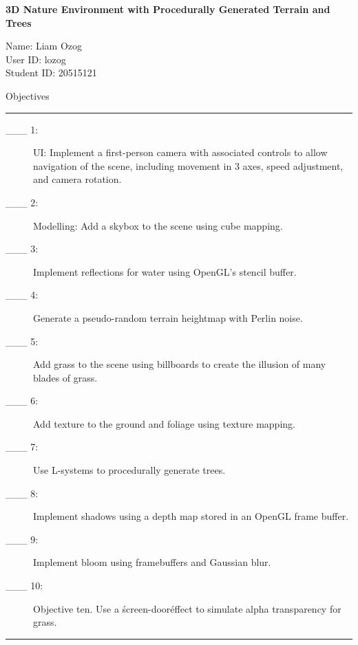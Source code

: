 \documentclass{article}
\newcommand\projecttitle{3D Nature Environment with Procedurally Generated Terrain and Trees}
\newcommand\myname{Liam Ozog}
\newcommand\myuserid{lozog}
\newcommand\mystudentid{20515121}
\begin{document}
\newpage

{\huge \bf 
	\projecttitle 
}

\medskip
Name: \myname \\ 
User ID: \myuserid \\ 
Student ID: \mystudentid 

\bigskip
{\Large Objectives}

\hrule
\begin{description}
        \item[\_\_\_ 1:]
          UI: Implement a first-person camera with associated controls to allow navigation of the scene, including movement in 3 axes, speed adjustment, and camera rotation.

        \item[\_\_\_ 2:]
		  Modelling: Add a skybox to the scene using cube mapping.

        \item[\_\_\_ 3:]
		  Implement reflections for water using OpenGL's stencil buffer.
			
        \item[\_\_\_ 4:]
		  Generate a pseudo-random terrain heightmap with Perlin noise.

        \item[\_\_\_ 5:]
		  Add grass to the scene using billboards to create the illusion of many blades of grass.

        \item[\_\_\_ 6:]
	      Add texture to the ground and foliage using texture mapping.

        \item[\_\_\_ 7:]
		  Use L-systems to procedurally generate trees.

        \item[\_\_\_ 8:]
		  Implement shadows using a depth map stored in an OpenGL frame buffer.

        \item[\_\_\_ 9:]
		  Implement bloom using framebuffers and Gaussian blur.

        \item[\_\_\_ 10:]
		  Objective ten. Use a \'screen-door\' effect to simulate alpha transparency for grass.

\end{description}

\hrule
\end{document}
